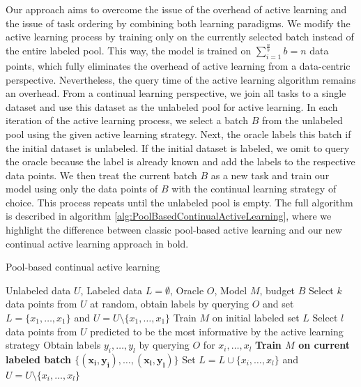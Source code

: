 Our approach aims to overcome the issue of the overhead of active learning and the issue of task ordering by combining both learning paradigms. We modify the active
learning process by training only on the currently selected batch instead of the entire labeled pool. This way, the model is trained on $\sum_{i=1}^{\frac{n}{b}} b = n$ 
data points, which fully eliminates the overhead of active learning from a data-centric perspective. Nevertheless, the query time of the active learning algorithm remains
an overhead. From a continual learning perspective, we join all tasks to a single dataset and use this dataset as the unlabeled pool for active learning. In each iteration
of the active learning process, we select a batch $B$ from the unlabeled pool using the given active learning strategy. Next, the oracle labels this batch if the initial
dataset is unlabeled. If the initial dataset is labeled, we omit to query the oracle because the label is already known and add the labels
to the respective data points. We then treat the current batch $B$ as a new task and train our model using only the data points of $B$ with the continual learning strategy of
choice. This process repeats until the unlabeled pool is empty. The full algorithm is described in algorithm \ref{alg:PoolBasedContinualActiveLearning}, where we highlight
the difference between classic pool-based active learning and our new continual active learning approach in bold. \par

\begin{algorithm}
    \caption{Pool-based continual active learning} \label{alg:PoolBasedContinualActiveLearning}
    \begin{algorithmic}[1]
        \Require Unlabeled data $U$, Labeled data $L = \emptyset$, Oracle $O$, Model $M$, budget $B$
        \State Select $k$ data points from $U$ at random, obtain labels by querying $O$ and set $L=\{x_1,\ldots,x_1\}$
        and $U = U \setminus \{x_1,\ldots,x_1\}$ 
        \State Train $M$ on initial labeled set $L$
            \State Select $l$ data points from $U$ predicted to be the most informative by the active learning strategy
            \State Obtain labels $y_i,\ldots,y_l$ by querying $O$ for $x_i,\ldots,x_l$
            \State \textbf{Train $M$ on current labeled batch $\{\mathbf{(x_i,y_i),\ldots,(x_l,y_l)}\}$}
            \State Set $L= L \cup \{x_i,\ldots,x_l\}$ and $U = U \setminus \{x_i,\ldots,x_l\}$
        \EndWhile
    \end{algorithmic}
\end{algorithm}


